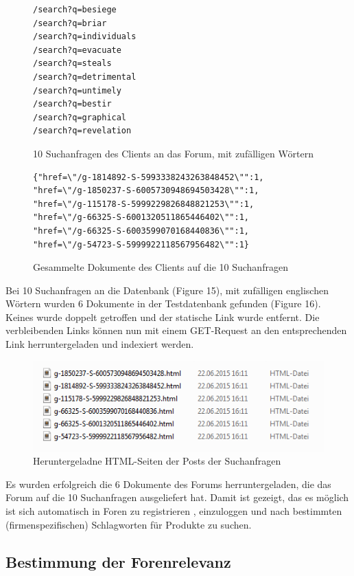 \begin{figure}[h!]
\begin{lstlisting}[language=HTML5]
/search?q=besiege
/search?q=briar
/search?q=individuals
/search?q=evacuate
/search?q=steals
/search?q=detrimental
/search?q=untimely
/search?q=bestir
/search?q=graphical
/search?q=revelation
\end{lstlisting}
\caption{10 Suchanfragen des Clients an das Forum, mit zufälligen Wörtern}
\end{figure}

\begin{figure}[h!]
\begin{lstlisting}[language=HTML5]
{"href=\"/g-1814892-S-5993338243263848452\"":1,
"href=\"/g-1850237-S-6005730948694503428\"":1,
"href=\"/g-115178-S-5999229826848821253\"":1,
"href=\"/g-66325-S-6001320511865446402\"":1,
"href=\"/g-66325-S-6003599070168440836\"":1,
"href=\"/g-54723-S-5999922118567956482\"":1}
\end{lstlisting}
\caption{Gesammelte Dokumente des Clients auf die 10 Suchanfragen}
\end{figure}

Bei 10 Suchanfragen an die Datenbank (Figure 15), mit zufälligen englischen Wörtern wurden 6 Dokumente in der Testdatenbank gefunden (Figure 16). Keines wurde doppelt getroffen und der statische Link wurde entfernt. Die verbleibenden Links können nun mit einem GET-Request an den entsprechenden Link herruntergeladen und indexiert werden.
\newpage

\begin{figure}[h!]
\includegraphics{./images/postdownload.png}
\caption{Heruntergeladne HTML-Seiten der Posts der Suchanfragen}
\end{figure}


Es wurden erfolgreich die 6 Dokumente des Forums herruntergeladen, die das Forum auf die 10 Suchanfragen ausgeliefert hat.
Damit ist gezeigt, das es möglich ist sich automatisch in Foren zu registrieren , einzuloggen und nach bestimmten (firmenspezifischen) Schlagworten für Produkte zu suchen.

\subsection{Bestimmung der Forenrelevanz}

